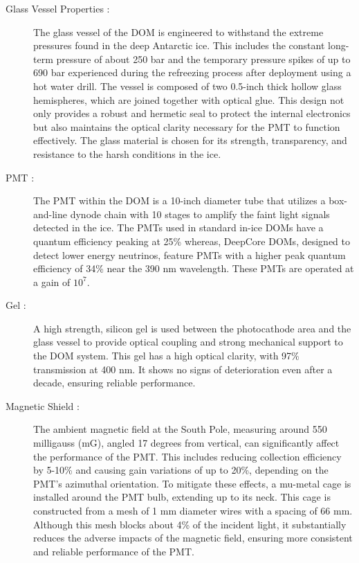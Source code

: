 \begin{description}
    \item[Glass Vessel Properties :] The glass vessel of the DOM is engineered to withstand the extreme pressures found in the deep Antarctic ice. This includes the constant long-term pressure of about 250 bar and the temporary pressure spikes of up to 690 bar experienced during the refreezing process after deployment using a hot water drill. The vessel is composed of two 0.5-inch thick hollow glass hemispheres, which are joined together with optical glue. This design not only provides a robust and hermetic seal to protect the internal electronics but also maintains the optical clarity necessary for the PMT to function effectively. The glass material is chosen for its strength, transparency, and resistance to the harsh conditions in the ice.

    \item[PMT :] The PMT within the DOM is a 10-inch diameter tube that utilizes a box-and-line dynode chain with 10 stages to amplify the faint light signals detected in the ice. The PMTs used in standard in-ice DOMs have a quantum efficiency peaking at 25\% whereas, DeepCore DOMs, designed to detect lower energy neutrinos, feature PMTs with a higher peak quantum efficiency of 34\% near the 390 nm wavelength. These PMTs are operated at a gain of $10^7$.

    \item[Gel :] A high strength, silicon gel is used between the photocathode area and the glass vessel to provide optical coupling and strong mechanical support to the DOM system. This gel has a high optical clarity, with 97\% transmission at 400 nm. It shows no signs of deterioration even after a decade, ensuring reliable performance.

    \item[Magnetic Shield :] The ambient magnetic field at the South Pole, measuring around 550 milligauss (mG), angled 17 degrees from vertical, can significantly affect the performance of the PMT. This includes reducing collection efficiency by 5-10\% and causing gain variations of up to 20\%, depending on the PMT's azimuthal orientation. To mitigate these effects, a mu-metal cage is installed around the PMT bulb, extending up to its neck. This cage is constructed from a mesh of 1 mm diameter wires with a spacing of 66 mm. Although this mesh blocks about 4\% of the incident light, it substantially reduces the adverse impacts of the magnetic field, ensuring more consistent and reliable performance of the PMT.


\end{description}
